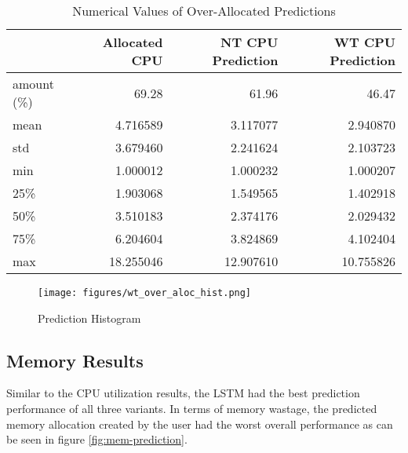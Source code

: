 \documentclass{article}
\begin{document}
    \begin{table}
      \centering
      \begin{tabular}{|l|rrr|}
        \hline
        {} &  \textbf{Allocated CPU} &  \textbf{NT CPU Prediction} &  \textbf{WT CPU Prediction} \\
        \hline
        amount (\%) &        69.28&             61.96 &             46.47 \\
        mean  &       4.716589 &                3.117077 &                2.940870 \\
        std   &       3.679460 &                2.241624 &                2.103723 \\
        min   &       1.000012 &                1.000232 &                1.000207 \\
        25\%   &       1.903068 &                1.549565 &                1.402918 \\
        50\%   &       3.510183 &                2.374176 &                2.029432 \\
        75\%   &       6.204604 &                3.824869 &                4.102404 \\
        max   &      18.255046 &               12.907610 &               10.755826 \\
        \hline
        \end{tabular}
        \caption{Numerical Values of Over-Allocated Predictions}
        \label{tab:numerical-values-of-cpu-prediction-variants}
    \end{table}
  
      \begin{figure}[h!]
        \centering
        \texttt{[image: figures/wt\_over\_aloc\_hist.png]}
        \caption{ Prediction Histogram}
        \label{fig:wt-over-aloc-hist}
      \end{figure}

  \subsection{Memory Results}
  \label{sec:mem-results}

    Similar to the CPU utilization results, the LSTM  had the best prediction performance of all three variants. In terms of memory wastage, the predicted memory allocation created by the user had the worst overall performance as can be seen in figure \ref{fig:mem-prediction}.
    
\end{document}

